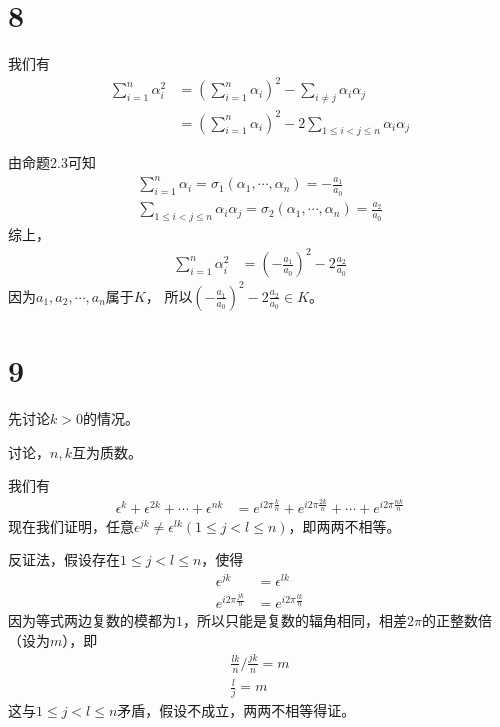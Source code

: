\documentclass{article}
\begin{document}
\section*{8}

我们有
\begin{align*}
  \sum\limits_{i = 1}^n \alpha_i^2
   & = (\sum\limits_{i = 1}^n \alpha_i)^2
  - \sum\limits_{i \neq j} \alpha_i \alpha_j \\
   & = (\sum\limits_{i = 1}^n \alpha_i)^2
  - 2 \sum\limits_{1 \leq i < j \leq n} \alpha_i \alpha_j
\end{align*}

由命题2.3可知
\begin{align*}
  \sum\limits_{i = 1}^n \alpha_i = \sigma_1(\alpha_1, \cdots, \alpha_n) = - \frac{a_1}{a_0} \\
  \sum\limits_{1 \leq i < j \leq n} \alpha_i \alpha_j = \sigma_2(\alpha_1, \cdots, \alpha_n) = \frac{a_2}{a_0}
\end{align*}
综上，
\begin{align*}
  \sum\limits_{i = 1}^n \alpha_i^2
   & = (- \frac{a_1}{a_0})^2 - 2 \frac{a_2}{a_0}
\end{align*}
因为$a_1, a_2, \cdots , a_n$属于$K$，
所以$(- \frac{a_1}{a_0})^2 - 2 \frac{a_2}{a_0} \in K$。

\section*{9}

先讨论$k > 0$的情况。

讨论，$n, k$互为质数。

我们有
\begin{align*}
  \epsilon^k + \epsilon^{2k} + \cdots + \epsilon^{nk}
   & = e^{i 2\pi \frac{k}{n}} + e^{i 2\pi \frac{2k}{n}} + \cdots + e^{i 2\pi \frac{nk}{n}}
\end{align*}
现在我们证明，任意$\epsilon^{jk} \neq \epsilon^{lk}(1 \leq j < l \leq n)$，即两两不相等。

反证法，假设存在$1 \leq j < l \leq n$，使得
\begin{align*}
  \epsilon^{jk}           & = \epsilon^{lk}           \\
  e^{i 2\pi \frac{jk}{n}} & = e^{i 2\pi \frac{lk}{n}}
\end{align*}
因为等式两边复数的模都为$1$，所以只能是复数的辐角相同，相差$2\pi$的正整数倍（设为$m$），即
\begin{align*}
  \frac{lk}{n} / \frac{jk}{n} = m \\
  \frac{l}{j} = m
\end{align*}
这与$1 \leq j < l \leq n$矛盾，假设不成立，两两不相等得证。
\end{document}
